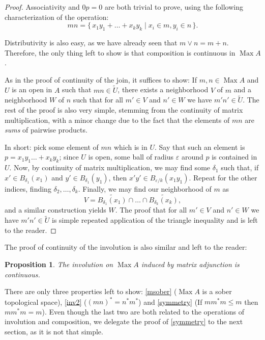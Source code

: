\documentclass{article}
\theoremstyle{plain}
\newtheorem{prop}{Proposition}
\theoremstyle{nonumberplain}
\newtheorem{proof}{Proof}
\DeclareMathOperator{\Max}{Max}
\begin{document}
\begin{proof}
Associativity and $0p = 0$ are both trivial to prove, using the following characterization of the operation:
\[mn = \{\, x_1 y_1 + \dots + x_k y_k \mid x_i \in m, y_i \in n \,\}.\]

Distributivity is also easy, as we have already seen that $m \lor n = m + n$. Therefore, the only thing left to show is that composition is continuous in $\Max A$.

As in the proof of continuity of the join, it suffices to show: If $m,n \in \Max A$ and $U$ is an open in $A$ such that $mn \in \tilde U$, there exists a neighborhood $V$ of $m$ and a neighborhood $W$ of $n$ such that for all $m' \in V$ and $n' \in W$ we have $m'n' \in \tilde U$. The rest of the proof is also very simple, stemming from the continuity of matrix multiplication, with a minor change due to the fact that the elements of $mn$ are \emph{sums} of pairwise products.

In short: pick some element of $mn$ which is in $U$. Say that such an element is $p = x_1 y_1 \dots + x_k y_k$; since $U$ is open, some ball of radius $\varepsilon$ around $p$ is contained in $U$. Now, by continuity of matrix multiplication, we may find some $\delta_1$ such that, if $x' \in B_{\delta_1}(x_1)$ and $y' \in B_{\delta_1}(y_1)$, then $x' y' \in B_{\varepsilon/k} (x_1 y_1)$. Repeat for the other indices, finding $\delta_2, \dots, \delta_k$. Finally, we may find our neighborhood of $m$ as
\[V = \widetilde{B_{\delta_1}(x_1)} \cap \dots \cap \widetilde{B_{\delta_k}(x_k)},\]
and a similar construction yields $W$. The proof that for all $m' \in V$ and $n' \in W$ we have $m' n' \in \tilde U$ is simple repeated application of the triangle inequality and is left to the reader.
\end{proof}

The proof of continuity of the involution is also similar and left to the reader:

\begin{prop}
The involution on $\Max A$ induced by matrix adjunction is continuous.
\end{prop}

There are only three properties left to show: \ref{msober} ($\Max A$ is a sober topological space), \ref{inv2} ($(mn)^* = n^* m^*$) and \ref{symmetry} (If $m m^* m \leq m$ then $m m^* m = m$). Even though the last two are both related to the operations of involution and composition, we delegate the proof of \ref{symmetry} to the next section, as it is not that simple.
\end{document}
